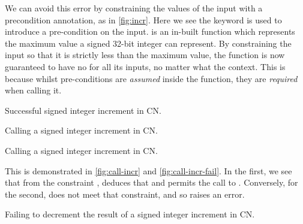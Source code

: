 We can avoid this error by constraining the values of the input with a
precondition annotation, as in \cref{fig:incr}. Here we see the keyword
 is used to introduce a pre-condition on the input.
 is an in-built function which represents the maximum value a
signed 32-bit integer can represent. By constraining the input so that it is
strictly less than the maximum value, the function is now guaranteed to have
no  for all its inputs, no matter what the context. This is because
whilst pre-conditions are \emph{assumed} inside the function, they are
\emph{required} when calling it.

\begin{marginfigure}
    \centering
    \caption{Successful signed integer increment in CN.}\label{fig:incr}
\end{marginfigure}

\begin{marginfigure}
    \ContinuedFloat*
    \centering
    \caption{Calling a signed integer increment in CN.}\label{fig:call-incr}
\end{marginfigure}

\begin{marginfigure}
    \ContinuedFloat{}
    \centering
    \caption{Calling a signed integer increment in CN.}\label{fig:call-incr-fail}
\end{marginfigure}

This is demonstrated in \cref{fig:call-incr} and \cref{fig:call-incr-fail}. In
the first, we see that from the constraint ,  deduces that  and permits the call to
. Conversely, for the second,  does not
meet that constraint, and so  raises an error.

\begin{marginfigure}
    \centering
    \caption{Failing to decrement the result of a signed integer increment in
        CN.}\label{fig:decr-broken}
\end{marginfigure}

